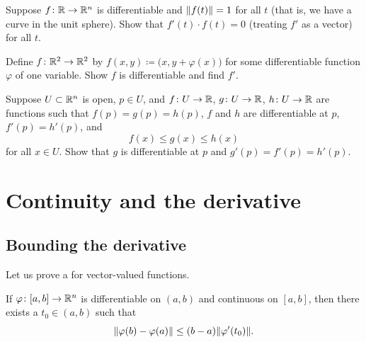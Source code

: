 \begin{exercise}
Suppose $f \colon {\mathbb{R}} \to {\mathbb{R}}^n$ is differentiable and $\lVert {f(t)} \rVert = 1$ for
all $t$ (that is, we have a curve in the unit sphere).  Show that 
$f'(t) \cdot f(t) = 0$ (treating $f'$ as a vector) for all $t$.
\end{exercise}

\begin{exercise}
Define $f \colon {\mathbb{R}}^2 \to {\mathbb{R}}^2$ by $f(x,y) \coloneqq
\bigl(x,y+\varphi(x)\bigr)$ for some differentiable function $\varphi$ of one
variable.  Show $f$ is differentiable and find $f'$.
\end{exercise}

\begin{exercise}
Suppose $U \subset {\mathbb{R}}^n$ is open, $p \in U$, and
$f \colon U \to {\mathbb{R}}$,
$g \colon U \to {\mathbb{R}}$,
$h \colon U \to {\mathbb{R}}$ are functions such that
$f(p) = g(p) = h(p)$, $f$ and $h$ are differentiable at $p$,
$f'(p) = h'(p)$, and
\begin{equation*}
f(x) \leq g(x) \leq h(x)
\end{equation*}
for all $x \in U$.  Show that $g$ is differentiable at $p$ and 
$g'(p) = f'(p) = h'(p)$.
\end{exercise}


\sectionnewpage
\section{Continuity and the derivative}
\label{sec:svthedercont}


\subsection{Bounding the derivative}

Let us prove a  for vector-valued functions.

\begin{lemma} \label{lemma:mvtmv}
If $\varphi \colon [a,b] \to {\mathbb{R}}^n$ is differentiable on $(a,b)$ and
continuous on $[a,b]$, then there exists a $t_0 \in (a,b)$ such that
\begin{equation*}
\lVert {\varphi(b)-\varphi(a)} \rVert \leq (b-a) \lVert {\varphi'(t_0)} \rVert .
\end{equation*}
\end{lemma}

